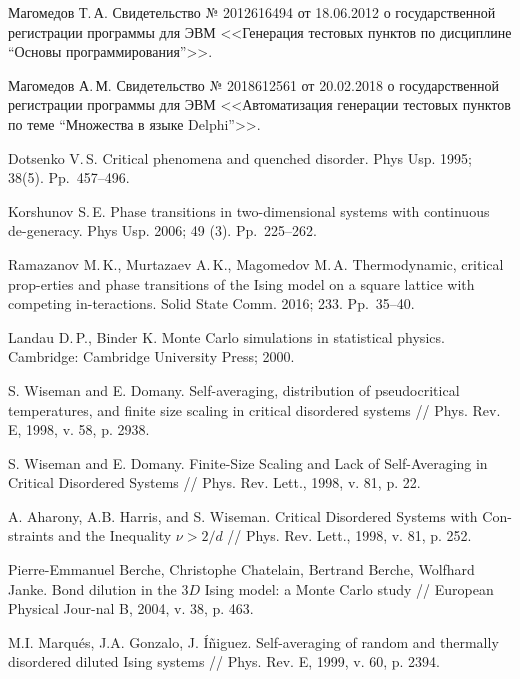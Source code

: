 \begin{thebibliography}{111}
Магомедов Т.\,А. Свидетельство № 2012616494 от 18.06.2012 о государственной регистрации программы для ЭВМ <<Генерация тестовых пунктов по дисциплине “Основы программирования”>>.

 Магомедов А.\,М. Свидетельство № 2018612561 от 20.02.2018 о государственной регистрации программы для ЭВМ <<Автоматизация генерации тестовых пунктов по теме “Множества в языке Delphi”>>.








Dotsenko V.\,S. Critical phenomena and quenched disorder.
Phys Usp. 1995; 38(5). Pp.~457--496.

Korshunov S.\,E. Phase transitions in two-dimensional systems with continuous de-generacy.
Phys Usp. 2006; 49 (3). Pp.~225–262.

Ramazanov M.\,K., Murtazaev A.\,K., Magomedov M.\,A.
Thermodynamic, critical prop-erties and phase transitions of the Ising model on a square lattice with competing in-teractions.
Solid State Comm. 2016; 233. Pp.~35--40.

Landau D.\,P., Binder K.
Monte Carlo simulations in statistical physics. Cambridge: Cambridge University Press; 2000.




S. Wiseman and E. Domany. Self-averaging, distribution of pseudocritical temperatures, and finite size scaling in critical disordered systems // Phys. Rev. E, 1998, v. 58, p. 2938.

S. Wiseman and E. Domany. Finite-Size Scaling and Lack of Self-Averaging in Critical Disordered Systems // Phys. Rev. Lett., 1998, v. 81, p. 22.

A. Aharony, A.B. Harris, and S. Wiseman. Critical Disordered Systems with Con-straints and the Inequality $\nu > 2/d$  // Phys. Rev. Lett., 1998, v. 81,  p. 252.

Pierre-Emmanuel Berche, Christophe Chatelain, Bertrand Berche, Wolfhard Janke. Bond dilution in the $3D$ Ising model: a Monte Carlo study // European Physical Jour-nal B, 2004, v. 38, p. 463.

M.I. Marqués, J.A. Gonzalo, J. Íñiguez. Self-averaging of random and thermally disordered diluted Ising systems // Phys. Rev. E, 1999, v. 60, p. 2394.


\end{thebibliography}

